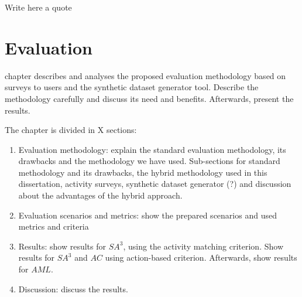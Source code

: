 

\begin{savequote}[50mm]
Write here a quote
\end{savequote}


\chapter{Evaluation}
\label{cha:evaluation}

\ifpdf
    \graphicspath{{6_evaluation/figures/PDF/}{6_evaluation/figures/PNG/}{6_evaluation/figures/}}
\else
    \graphicspath{{6_evaluation/figures/EPS/}{6_evaluation/figures/}}
\fi

 chapter describes and analyses the proposed evaluation methodology based on surveys to users and the synthetic dataset generator tool. Describe the methodology carefully and discuss its need and benefits. Afterwards, present the results.

The chapter is divided in X sections:

\begin{enumerate}
 \item Evaluation methodology: explain the standard evaluation methodology, its drawbacks and the methodology we have used. Sub-sections for standard methodology and its drawbacks, the hybrid methodology used in this dissertation, activity surveys, synthetic dataset generator (?) and discussion about the advantages of the hybrid approach.
 \item Evaluation scenarios and metrics: show the prepared scenarios and used metrics and criteria
 \item Results: show results for $SA^3$, using the activity matching criterion. Show results for $SA^3$ and $AC$ using action-based criterion. Afterwards, show results for $AML$.
 \item Discussion: discuss the results.
\end{enumerate}
